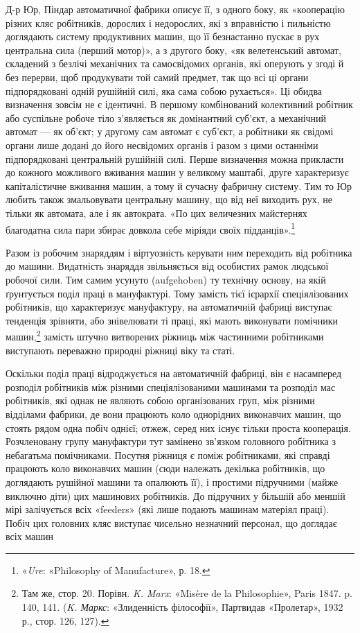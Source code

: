 Д-р Юр, Піндар автоматичної фабрики описує її, з одного
боку, як «кооперацію різних кляс робітників, дорослих і недорослих,
які з вправністю і пильністю доглядають систему продуктивних
машин, що її безнастанно пускає в рух центральна
сила (перший мотор)», а з другого боку, «як велетенський автомат,
складений з безлічі механічних та самосвідомих органів,
які оперують у згоді й без перерви, щоб продукувати той самий
предмет, так що всі ці органи підпорядковані одній рушійній
силі, яка сама собою рухається». Ці обидва визначення зовсім
не є ідентичні. В першому комбінований колективний робітник
або суспільне робоче тіло з’являється як домінантний суб’єкт,
а механічний автомат — як об’єкт; у другому сам автомат є
суб’єкт, а робітники як свідомі органи лише додані до його
несвідомих органів і разом з цими останніми підпорядковані
центральній рушійній силі. Перше визначення можна прикласти
до кожного можливого вживання машин у великому маштабі,
друге характеризує капіталістичне вживання машин, а тому й
сучасну фабричну систему. Тим то Юр любить також змальовувати
центральну машину, що від неї виходить рух, не тільки як
автомата, але і як автократа. «По цих величезних майстернях
благодатна сила пари збирає довкола себе міріяди своїх підданців».\footnote{
«\emph{Ure}: «Philosophy of Manufacture», р. 18.
}

Разом із робочим знаряддям і віртуозність керувати ним
переходить від робітника до машини. Видатність знаряддя звільняється
від особистих рамок людської робочої сили. Тим самим
усунуто (aufgehoben) ту технічну основу, на якій ґрунтується
поділ праці в мануфактурі. Тому замість тієї ієрархії спеціялізованих
робітників, що характеризує мануфактуру, на автоматичній
фабриці виступає тенденція зрівняти, або знівелювати ті
праці, які мають виконувати помічники машин,\footnote{
Там же, стор. 20. Порівн. \emph{K. Marx}: «Misère de la Philosophie»,
Paris 1847. p. 140, 141. (\emph{K. Маркс}: «Злиденність філософії», Партвидав
«Пролетар», 1932 р., стор. 126, 127).
} замість штучно
витворених ріжниць між частинними робітниками виступають
переважно природні ріжниці віку та статі.

Оскільки поділ праці відроджується на автоматичній фабриці,
він є насамперед розподіл робітників між різними спеціялізованими
машинами та розподіл мас робітників, які однак не являють
собою організованих груп, між різними відділами фабрики, де
вони працюють коло однорідних виконавчих машин, що стоять
рядом одна побіч однієї; отжеж, серед них існує тільки проста
кооперація. Розчленовану групу мануфактури тут замінено
зв’язком головного робітника з небагатьма помічниками. Посутня
ріжниця є поміж робітниками, які справді працюють коло виконавчих
машин (сюди належать декілька робітників, що доглядають
рушійної машини та опалюють її), і простими підручними
(майже виключно діти) цих машинових робітників. До підручних
у більшій або меншій мірі залічується всіх «feeders» (які
лише подають машинам матеріял праці). Побіч цих головних кляс
виступає чисельно незначний персонал, що доглядає всіх машин
\parbreak{}  %
